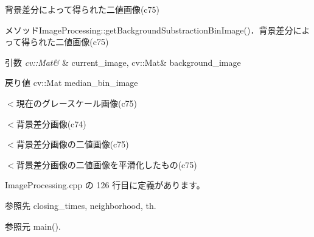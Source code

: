 背景差分によって得られた二値画像(c75) 

メソッド\-Image\-Processing\-::get\-Background\-Substraction\-Bin\-Image()．背景差分によって得られた二値画像(c75)


\begin{DoxyParams}{引数}
{\em cv\-::\-Mat\&} & current\-\_\-image, cv\-::\-Mat\& background\-\_\-image \\
\hline
\end{DoxyParams}
\begin{DoxyReturn}{戻り値}
cv\-::\-Mat median\-\_\-bin\-\_\-image 
\end{DoxyReturn}
$<$現在のグレースケール画像(c75)

$<$背景差分画像(c74)

$<$背景差分画像の二値画像(c75)

$<$背景差分画像の二値画像を平滑化したもの(c75) 

 Image\-Processing.\-cpp の 126 行目に定義があります。



参照先 closing\-\_\-times, neighborhood, th.



参照元 main().


